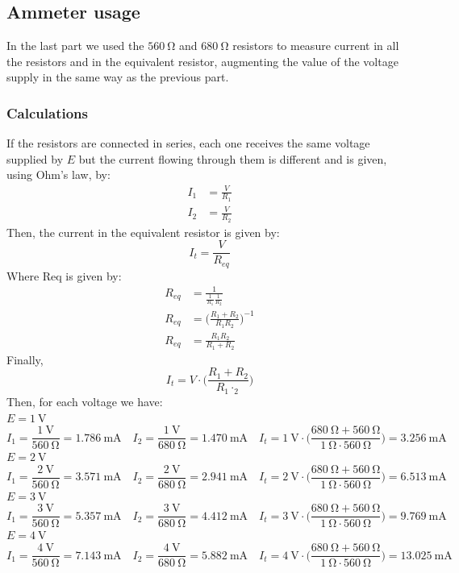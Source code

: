 \documentclass[a4paper]{article}
\begin{document}
\subsection{Ammeter usage}
In the last part we used the $\SI{560}{\ohm}$ and $\SI{680}{\ohm}$ resistors to measure current in all the resistors and in the equivalent resistor, augmenting the value of the voltage supply in the same way as the previous part.
\subsubsection{Calculations}
If the resistors are connected in series, each one receives the same voltage supplied by $E$ but the current flowing through them is different and is given, using Ohm's law, by:
\begin{align*}
I_1&=\frac{V}{R_1}\\
I_2&=\frac{V}{R_2}
\end{align*}
Then, the current in the equivalent resistor is given by:
\[I_t=\frac{V}{R_{eq}}\]
Where Req is given by:
\begin{align*}
R_{eq}&=\frac{1}{\frac{1}{R_1}\frac{1}{R_2}}\\
R_{eq}&=\Big(\frac{R_1+R_2}{R_1 R_2}\Big)^{-1}\\
R_{eq}&=\frac{R_1R_2}{R_1+R_2}
\end{align*}
Finally, 
\[I_t=V\cdot\Big(\frac{R_1+R_2}{R_1\cdot_2}\Big)\]
Then, for each voltage we have:\\
$E=\SI{1}{\volt}$
\[I_1=\frac{\SI{1}{\volt}}{\SI{560}{\ohm}}=\SI{1.786}{\milli\ampere}
\quad
I_2=\frac{\SI{1}{\volt}}{\SI{680}{\ohm}}=\SI{1.470}{\milli\ampere}
\quad
I_{t}=\SI{1}{\volt}\cdot\Big(\frac{\SI{680}{\ohm}+\SI{560}{\ohm}}{\SI{1}{\ohm}\cdot\SI{560}{\ohm}}\Big)=\SI{3.256}{\milli\ampere}
\]
$E=\SI{2}{\volt}$
\[I_1=\frac{\SI{2}{\volt}}{\SI{560}{\ohm}}=\SI{3.571}{\milli\ampere}
\quad
I_2=\frac{\SI{2}{\volt}}{\SI{680}{\ohm}}=\SI{2.941}{\milli\ampere}
\quad
I_{t}=\SI{2}{\volt}\cdot\Big(\frac{\SI{680}{\ohm}+\SI{560}{\ohm}}{\SI{1}{\ohm}\cdot\SI{560}{\ohm}}\Big)=\SI{6.513}{\milli\ampere}
\]
$E=\SI{3}{\volt}$
\[I_1=\frac{\SI{3}{\volt}}{\SI{560}{\ohm}}=\SI{5.357}{\milli\ampere}
\quad
I_2=\frac{\SI{3}{\volt}}{\SI{680}{\ohm}}=\SI{4.412}{\milli\ampere}
\quad
I_{t}=\SI{3}{\volt}\cdot\Big(\frac{\SI{680}{\ohm}+\SI{560}{\ohm}}{\SI{1}{\ohm}\cdot\SI{560}{\ohm}}\Big)=\SI{9.769}{\milli\ampere}
\]
$E=\SI{4}{\volt}$
\[I_1=\frac{\SI{4}{\volt}}{\SI{560}{\ohm}}=\SI{7.143}{\milli\ampere}
\quad
I_2=\frac{\SI{4}{\volt}}{\SI{680}{\ohm}}=\SI{5.882}{\milli\ampere}
\quad
I_{t}=\SI{4}{\volt}\cdot\Big(\frac{\SI{680}{\ohm}+\SI{560}{\ohm}}{\SI{1}{\ohm}\cdot\SI{560}{\ohm}}\Big)=\SI{13.025}{\milli\ampere}
\]
\end{document}
